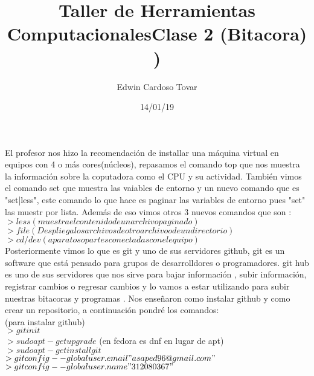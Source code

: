\documentclass[letterpaper, 12pt, oneside]{article}%
\title{\Huge Taller de Herramientas Computacionales}
\author{Edwin Cardoso Tovar}%
\date{14/01/19}%
\begin{document}
	\maketitle
	\begin{center}%
	\end{center}%
	\newpage%
	
	\title{\textbf{\Huge Clase 2 (Bitacora)\\}) \\}%
	
	El profesor nos hizo la recomendación de installar una máquina virtual en equipos con 4 o más cores(núcleos), repasamos el comando top que nos muestra la información sobre la coputadora como el CPU y su actividad.
	También vimos el comando set que muestra las vaiables de entorno y un nuevo comando que es "set|less", este comando lo que hace es paginar las variables de entorno pues "set" las muestr por lista.
	Además de eso vimos otros 3 nuevos comandos que son :\\
	$>less (muestra el contenido de un archivo paginado)$\\
	$>file (Despliega los archivos de otro archivo o de un directorio)$\\
	$>cd  /dev (aparatos o partes conectadas con el equipo)$\\
	
	Posteriormente vimos lo que es git y uno de sus servidores github, git es un software que está pensado para  grupos de desarrolldores o programadores.
	git hub es uno de sus servidores que nos sirve para bajar información , subir información, registrar cambios o regresar cambios y lo vamos a estar utilizando para subir nuestras bitacoras y programas .
    Nos enseñaron como instalar github y como crear un repositorio, a continuación pondré los comandos:\\
    (para instalar github)\\
    $>git init$\\
    $>sudo apt-get upgrade$  (en fedora es dnf en lugar de apt)\\
    $>sudo apt-get install git$
    $>git config --global user.email "asaped96@gmail.com"$\\
    $>git config --global user.name "312080367"$\\
    
\end{document}
